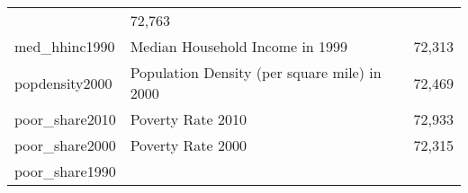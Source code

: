 \documentclass[]{book}
\begin{document}
\begin{longtable}[]{@{}lll@{}}
\begin{minipage}[t]{0.04\columnwidth}
\end{minipage} & \begin{minipage}[t]{0.04\columnwidth}\raggedright\strut
72,763\strut
\end{minipage}\tabularnewline
\begin{minipage}[t]{0.04\columnwidth}\raggedright\strut
med\_hhinc1990\strut
\end{minipage} & \begin{minipage}[t]{0.04\columnwidth}\raggedright\strut
Median Household Income in 1999\strut
\end{minipage} & \begin{minipage}[t]{0.04\columnwidth}\raggedright\strut
72,313\strut
\end{minipage}\tabularnewline
\begin{minipage}[t]{0.04\columnwidth}\raggedright\strut
popdensity2000\strut
\end{minipage} & \begin{minipage}[t]{0.04\columnwidth}\raggedright\strut
Population Density (per square mile) in 2000\strut
\end{minipage} & \begin{minipage}[t]{0.04\columnwidth}\raggedright\strut
72,469\strut
\end{minipage}\tabularnewline
\begin{minipage}[t]{0.04\columnwidth}\raggedright\strut
poor\_share2010\strut
\end{minipage} & \begin{minipage}[t]{0.04\columnwidth}\raggedright\strut
Poverty Rate 2010\strut
\end{minipage} & \begin{minipage}[t]{0.04\columnwidth}\raggedright\strut
72,933\strut
\end{minipage}\tabularnewline
\begin{minipage}[t]{0.04\columnwidth}\raggedright\strut
poor\_share2000\strut
\end{minipage} & \begin{minipage}[t]{0.04\columnwidth}\raggedright\strut
Poverty Rate 2000\strut
\end{minipage} & \begin{minipage}[t]{0.04\columnwidth}\raggedright\strut
72,315\strut
\end{minipage}\tabularnewline
\begin{minipage}[t]{0.04\columnwidth}\raggedright\strut
poor\_share1990\strut
\end{minipage} & \begin{minipage}[t]{0.04\columnwidth}\raggedright\strut

\end{minipage}
\end{longtable}
\end{document}
